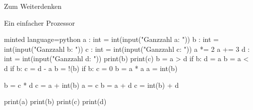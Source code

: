 \begin{task}[points=auto]{Zum Weiterdenken }
\begin{subtask*}[points=0]{Ein einfacher Prozessor}
        \begin{solution}
            \begin{codeBlock}[]{minted language=python}
                a : int = int(input("Ganzzahl a: "))
                b : int = int(input("Ganzzahl b: "))
                c : int = int(input("Ganzzahl c: "))
                a *= 2
                a += 3
                d : int = int(input("Ganzzahl d: "))
                print(b)
                print(c)
                b = a > d
                if b:
                    d = a
                b = a < d
                if b:
                    c = d - a
                b = !(b)
                if b:
                    c = 0
                b = a * a
                a = int(b)

                b = c * d
                c = a + int(b)
                a = c
                b = a + d
                c = int(b) + d

                print(a)
                print(b)
                print(c)
                print(d)
            \end{codeBlock}
        \end{solution}
    \end{subtask*}
\end{task}

